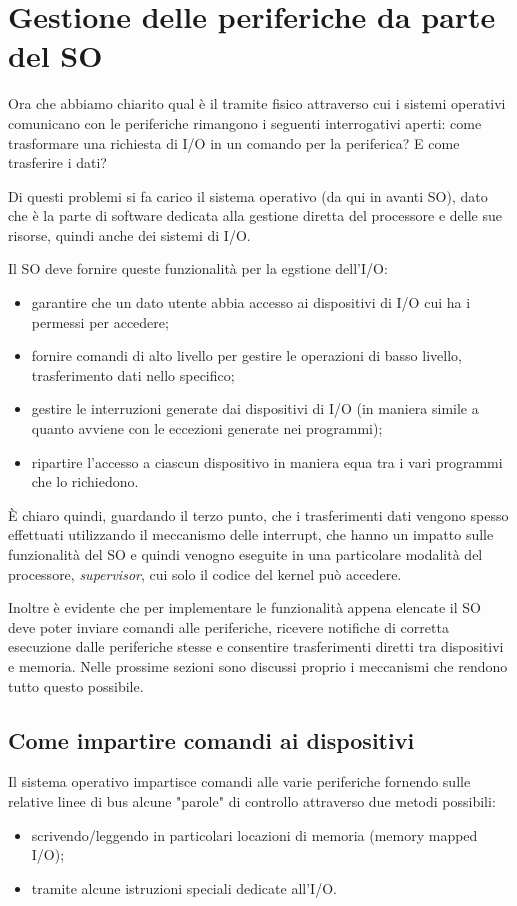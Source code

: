 \documentclass[class=book, crop=false, oneside]{standalone}
\begin{document}

\section{Gestione delle periferiche da parte del SO}
Ora che abbiamo chiarito qual è il tramite fisico attraverso cui i sistemi operativi comunicano con le periferiche rimangono i seguenti interrogativi aperti: come trasformare una richiesta di I/O in un comando per la periferica? E come trasferire i dati?

Di questi problemi si fa carico il sistema operativo (da qui in avanti SO), dato che è la parte di software dedicata alla gestione diretta del processore e delle sue risorse, quindi anche dei sistemi di I/O.

Il SO deve fornire queste funzionalità per la egstione dell'I/O:
\begin{itemize}
	\item garantire che un dato utente abbia accesso ai dispositivi di I/O cui ha i permessi per accedere;
	\item fornire comandi di alto livello per gestire le operazioni di basso livello, trasferimento dati nello specifico;
	\item gestire le interruzioni generate dai dispositivi di I/O (in maniera simile a quanto avviene con le eccezioni generate nei programmi);
	\item ripartire l’accesso a ciascun dispositivo in maniera equa tra i vari programmi che lo richiedono.
\end{itemize}
È chiaro quindi, guardando il terzo punto, che i trasferimenti dati vengono spesso effettuati utilizzando il meccanismo delle interrupt, che hanno un impatto sulle funzionalità del SO e quindi venogno eseguite in una particolare modalità del processore, \emph{supervisor}, cui solo il codice del kernel può accedere.

Inoltre è evidente che per implementare le funzionalità appena elencate il SO deve poter inviare comandi alle periferiche, ricevere notifiche di corretta esecuzione dalle periferiche stesse e consentire trasferimenti diretti tra dispositivi e memoria. Nelle prossime sezioni sono discussi proprio i meccanismi che rendono tutto questo possibile.

\subsection{Come impartire comandi ai dispositivi}
Il sistema operativo impartisce comandi alle varie periferiche fornendo sulle relative linee di bus alcune "parole" di controllo attraverso due metodi possibili:
\begin{itemize}
	\item scrivendo/leggendo in particolari locazioni di memoria (memory mapped I/O);
	\item tramite alcune istruzioni speciali dedicate all’I/O.
\end{itemize}
\end{document}
